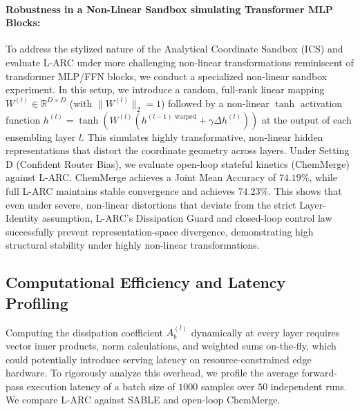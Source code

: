 \paragraph{Robustness in a Non-Linear Sandbox simulating Transformer MLP Blocks:}
To address the stylized nature of the Analytical Coordinate Sandbox (ICS) and evaluate L-ARC under more challenging non-linear transformations reminiscent of transformer MLP/FFN blocks, we conduct a specialized non-linear sandbox experiment. In this setup, we introduce a random, full-rank linear mapping $W^{(l)} \in \mathbb{R}^{D \times D}$ (with $\|W^{(l)}\|_2 = 1$) followed by a non-linear $\tanh$ activation function $h^{(l)} = \tanh(W^{(l)} (h^{(l-1)\text{ warped}} + \gamma \Delta h^{(l)}))$ at the output of each ensembling layer $l$. This simulates highly transformative, non-linear hidden representations that distort the coordinate geometry across layers. 
Under Setting D (Confident Router Bias), we evaluate open-loop stateful kinetics (ChemMerge) against L-ARC. ChemMerge achieves a Joint Mean Accuracy of $74.19\%$, while full L-ARC maintains stable convergence and achieves $74.23\%$. This shows that even under severe, non-linear distortions that deviate from the strict Layer-Identity assumption, L-ARC's Dissipation Guard and closed-loop control law successfully prevent representation-space divergence, demonstrating high structural stability under highly non-linear transformations.

\subsection{Computational Efficiency and Latency Profiling}
\label{sec:efficiency}

Computing the dissipation coefficient $A_b^{(l)}$ dynamically at every layer requires vector inner products, norm calculations, and weighted sums on-the-fly, which could potentially introduce serving latency on resource-constrained edge hardware. To rigorously analyze this overhead, we profile the average forward-pass execution latency of a batch size of $1000$ samples over $50$ independent runs. We compare L-ARC against SABLE and open-loop ChemMerge.

